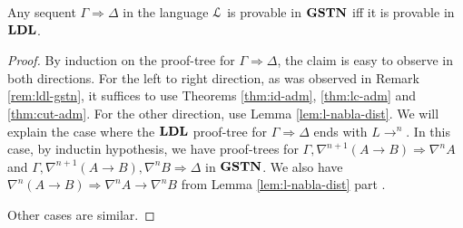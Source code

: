 \begin{thm}\label{thm:ldl-eq-gstn}
  Any sequent $\Gamma \Rightarrow \Delta$ in the language $\L$ is provable in $\GSTN$ iff it is provable in $\LDL$.
\end{thm}
\begin{proof}
  By induction on the proof-tree for $\Gamma \Rightarrow \Delta$, the claim is easy to observe in both directions. For the left to right direction, as was observed in Remark \ref{rem:ldl-gstn}, it suffices to use Theorems \ref{thm:id-adm}, \ref{thm:lc-adm} and \ref{thm:cut-adm}. For the other direction, use Lemma \ref{lem:l-nabla-dist}. We will explain the case where the $\LDL$ proof-tree for $\Gamma \Rightarrow \Delta$ ends with $L \rightarrow ^n$. In this case, by inductin hypothesis, we have proof-trees for $\Gamma, \nabla^{n+1} (A \rightarrow B) \Rightarrow \nabla^n A$ and $\Gamma, \nabla^{n+1} (A \rightarrow B), \nabla^n B \Rightarrow \Delta$ in $\GSTN$. We also have $\nabla^n (A \rightarrow B) \Rightarrow \nabla^n A \rightarrow \nabla^n B$ from Lemma \ref{lem:l-nabla-dist} part \3.

  \begin{prooftree}


  \end{prooftree}

  Other cases are similar.
\end{proof}